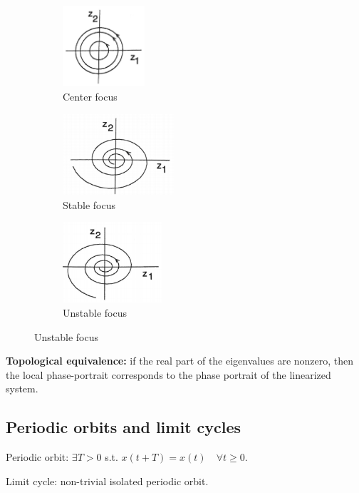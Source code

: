 \begin{figure}[!htb]
    \centering
    \begin{subfigure}{0.3\textwidth}
        \includegraphics[height=3cm]{figures/cf.png}
        \caption{Center focus}
    \end{subfigure}
    \begin{subfigure}{0.3\textwidth}
        \includegraphics[height=3cm]{figures/sf.png}
        \caption{Stable focus}
    \end{subfigure}
    \begin{subfigure}{0.3\textwidth}
        \includegraphics[height=3cm]{figures/uf.png}
        \caption{Unstable focus}
    \end{subfigure}
    \label{fig:phase_portraits2}
\end{figure}

\textbf{Topological equivalence:} if the real part of the eigenvalues are nonzero, then the local phase-portrait corresponds to the phase portrait of the linearized system.

\subsection{Periodic orbits and limit cycles}
\begin{definition}
    Periodic orbit: $\exists T>0$ s.t. $x(t+T)=x(t) \quad \forall t \geq 0$.
\end{definition}
\begin{definition}
    Limit cycle: non-trivial isolated periodic orbit.
\end{definition}

